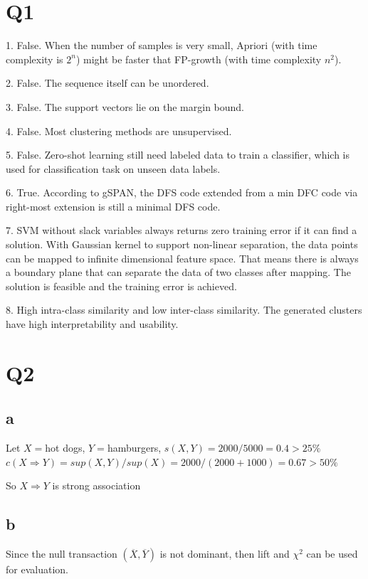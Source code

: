 \documentclass[]{article}
\begin{document}
\section*{Q1}
1. False. When the number of samples is very small, Apriori (with time complexity is $2^n$) might be faster that FP-growth (with time complexity $n^2$).

2. False. The sequence itself can be unordered. 

3. False. The support vectors lie on the margin bound. 

4. False. Most clustering methods are unsupervised. 

5. False. Zero-shot learning still need labeled data to train a classifier, which is used for classification task on unseen data labels. 

6. True. According to gSPAN, the DFS code extended from a min DFC code via right-most extension is still a minimal DFS code. 

7. SVM without slack variables always returns zero training error if it can find a solution. With Gaussian kernel to support non-linear separation, the data points can be mapped to infinite dimensional feature space. That means there is always a boundary plane that can separate the data of two classes after mapping. The solution is feasible and the training error is achieved. 

8. High intra-class similarity and low inter-class similarity. The generated clusters have high interpretability and usability. 


\newpage

\section*{Q2}
\subsection*{a}
Let $X=$hot dogs, $Y=$hamburgers,
$s(X,Y) = 2000/5000 =0.4 > 25\%$\\
$c(X\Rightarrow Y) = sup(X,Y)/sup(X)=2000/(2000+1000)=0.67 > 50\%$

So $X \Rightarrow Y$ is strong association

\subsection*{b}
Since the null transaction $(\overline{X}, \overline{Y})$ is not dominant, then lift and $\chi^2$ can be used for evaluation. 
\end{document}
